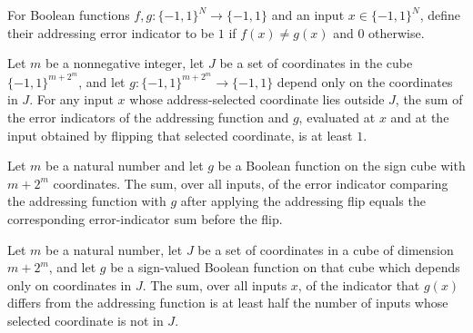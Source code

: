 \begin{definition}
\label{FABL.addressingErrorIndicator}
\leanok
{}
For Boolean functions $f,g\colon\{−1,1\}^N\to\{−1,1\}$ and an input $x\in\{−1,1\}^N$,
define their addressing error indicator to be $1$ if $f(x)\ne g(x)$ and $0$ otherwise.
\end{definition}

\begin{theorem}
\label{FABL.one_le_addressingErrorIndicator_add_flip}
\leanok
{}
Let $m$ be a nonnegative integer, let $J$ be a set of coordinates in the cube
$\{−1,1\}^{m+2^m}$, and let $g:\{−1,1\}^{m+2^m}\to\{−1,1\}$ depend only on the
coordinates in $J$. For any input $x$ whose address-selected coordinate lies outside
$J$, the sum of the error indicators of the addressing function and $g$, evaluated at
$x$ and at the input obtained by flipping that selected coordinate, is at least $1$.
\end{theorem}

\begin{theorem}
\label{FABL.sum_addressingErrorIndicator_flip}
\leanok
{}
Let $m$ be a natural number and let $g$ be a Boolean function on the sign cube with
$m+2^m$ coordinates. The sum, over all inputs, of the error indicator comparing the
addressing function with $g$ after applying the addressing flip equals the corresponding
error-indicator sum before the flip.
\end{theorem}

\begin{theorem}
\label{FABL.two_mul_sum_addressingErrorIndicator_ge_event_card}
\leanok
{}
Let $m$ be a natural number, let $J$ be a set of coordinates in a cube of dimension
$m+2^m$, and let $g$ be a sign-valued Boolean function on that cube which depends only
on coordinates in $J$. The sum, over all inputs $x$, of the indicator that $g(x)$
differs from the addressing function is at least half the number of inputs whose
selected coordinate is not in $J$.
\end{theorem}

